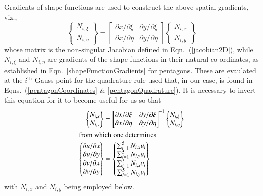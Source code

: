 Gradients of shape functions are used to construct the above spatial gradients, viz.,
\begin{displaymath}
    \begin{Bmatrix} 
    N_{i,\xi} \\ 
    N_{i,\eta}
    \end{Bmatrix} = \begin{bmatrix}
    \partial x / \partial \xi & \partial y / \partial \xi \\
    \partial x / \partial \eta & \partial y / \partial \eta
    \end{bmatrix} \begin{Bmatrix}
    N_{i,x} \\
    N_{i,y}
    \end{Bmatrix}
\end{displaymath}
whose matrix is the non-singular Jacobian defined in Eqn.~(\ref{jacobian2D}), while $N_{i,\xi}$ and $N_{i,\eta}$ are gradients of the shape functions in their natural co-ordinates, as established in Eqn.~\eqref{shapeFunctionGradients} for pentagons.  These are evaulated at the $i^{\text{th}}$ Gauss point for the quadrature rule used that, in our case, is found in Eqns.~(\ref{pentagonCoordinates} \& \ref{pentagonQuadrature}).  It is necessary to invert this equation for it to become useful for us so that
\begin{subequations}
    \label{pentagonGrads}
    \begin{align}
    \begin{Bmatrix} 
    N_{i,x} \\ 
    N_{i,y}
    \end{Bmatrix} & = \begin{bmatrix}
    \partial x / \partial \xi & \partial y / \partial \xi \\
    \partial x / \partial \eta & \partial y / \partial \eta
    \end{bmatrix}^{-1} \begin{Bmatrix}
    N_{i,\xi} \\
    N_{i,\eta}
    \end{Bmatrix} \\
    \intertext{from which one determines}
    \begin{Bmatrix}
    \partial u / \partial x \\
    \partial u / \partial y \\
    \partial v / \partial x \\
    \partial v / \partial y 
    \end{Bmatrix} & = \begin{Bmatrix}
    \sum\nolimits_{i=1}^5 N_{i,x} u_i \\
    \sum\nolimits_{i=1}^5 N_{i,y} u_i \\
    \sum\nolimits_{i=1}^5 N_{i,x} v_i \\
    \sum\nolimits_{i=1}^5 N_{i,y} v_i
    \end{Bmatrix}
    \end{align}
\end{subequations}
with $N_{i,x}$ and $N_{i,y}$ being employed below.

